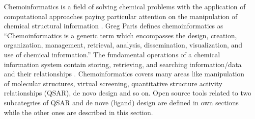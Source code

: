Chemoinformatics is a field of solving chemical problems with the application of computational approaches paying particular attention on the manipulation of chemical structural information \cite{Leach_2007} . Greg Paris defines chemoinformatics as “Chemoinformatics is a generic term which encompasses the design, creation, organization, management, retrieval, analysis, dissemination, visualization, and use of chemical information.” The fundamental operations of a chemical information system contain storing, retrieving, and searching information/data and their relationships \cite{Gasteiger_2003}\cite{2003}. Chemoinformatics covers many areas like manipulation of molecular structures, virtual screening, quantitative structure activity relationships (QSAR), de novo design and so on. Open source tools related to two subcategries of QSAR and de nove (ligand) design are defined in own sections while the other ones are described in this section.